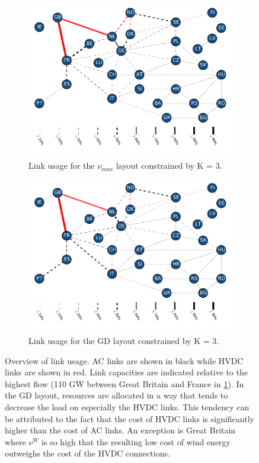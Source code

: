 \documentclass[a4paper, 5p, sort&compress]{elsarticle}%
\begin{document}
 \begin{figure}[p]
   \centering
   \begin{subfigure}{2\columnwidth}
     \includegraphics[width = 0.75 \columnwidth, center]{cfMaxK=3LINKS}
     \caption{Link usage for the $\nu_{max}$ layout constrained by K = 3.}
     \label{fig:linksCfMax}    
   \end{subfigure}
   \begin{subfigure}{2\columnwidth}
     \includegraphics[width = 0.75 \columnwidth, center]{seqK=3localizedLINKS}
     \caption{Link usage for the GD layout constrained by K = 3.}
     \label{fig:linksTransAgd}    
   \end{subfigure}
   \caption{Overview of link usage. AC links are shown in black while
     HVDC links are shown in red. Link capacities are indicated
     relative to the highest flow (110 GW between Great Britain and
     France in \cref{fig:linksCfMax}). In the GD layout, resources
     are allocated in a way that tends to decrease the load on
     especially the HVDC links. This tendency can be attributed to the
     fact that the cost of HVDC links is significantly higher than the
     cost of AC links. An exception is Great Britain where $\nu^{W}$ is
     so high that the resulting low cost of wind energy outweighs the
     cost of the HVDC connections.}
   \label{fig:links}
 \end{figure}
\end{document}
